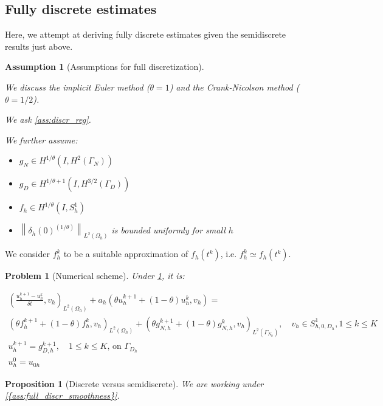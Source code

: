 \documentclass[english,a4paper,9pt,oneside]{scrbook}	%
\theoremstyle{break}
\newtheorem{prop}[equation]{Proposition}
\newtheorem{ass}[equation]{Assumption}
\newtheorem{pb}[equation]{Problem}
\theoremstyle{remark}
\newcommand{\norm}[1]{\left\lVert#1\right\rVert}
\begin{document}
\begin{appendices}
\section{Fully discrete estimates}
\label{sec:fullyd}
Here, we attempt at deriving fully discrete estimates given the semidiscrete results just above.

\begin{ass}[Assumptions for full discretization]
\label{ass:full_discr_smoothness}
\textcolor{white}{ }

We discuss the implicit Euler method ($\theta=1$) and the Crank-Nicolson method ($\theta=1/2$).

We ask \cref{ass:discr_reg}.

We further assume:

\begin{itemize}
	\item $g_N \in H^{1/\theta}(I, H^2(\Gamma_N))$
	\item $g_D \in H^{1/\theta+1}(I, H^{3/2}(\Gamma_D))$
	\item $f_h\in H^{1/\theta}(I, S^1_{h})$
	\item $\norm{\delta_{h}(0)^{(1/\theta)}}_{L^2(\Omega_h)}$ is bounded uniformly for small $h$
\end{itemize}

\end{ass}

We consider $f_h^k$ to be a suitable approximation of $f_h(t^k)$, i.e. $f_h^k \simeq f_h(t^k)$.

\begin{pb}[Numerical scheme]
\label{pb:num_scheme}
Under \cref{ass:full_discr_smoothness}, it is:

\begin{align*}
\left ( \frac{u_{h}^{k+1}-u_h^k}{\delta t}, v_h\right)_{L^2(\Omega_h)} + a_h(\theta u_h^{k+1}+(1-\theta)u^k_h, v_h) =\\ (\theta f_h^{k+1}+(1-\theta)f_h^k, v_h)_{L^2(\Omega_h)} + (\theta g_{N,h}^{k+1} + (1 - \theta)g_{N,h}^{k} , v_h)_{L^2(\Gamma_{N_h})},\quad v_h \in S^1_{h,0,D_h}, 1\leq k \leq K\\
u_h^{k+1}=g_{D,h}^{k+1},\quad 1\leq k \leq K \text{,  on } \Gamma_{D_h}\\
u_h^0=u_{0h}
\end{align*}

\end{pb}

\begin{prop}[Discrete versus semidiscrete]
\label{prop:d_vd_sd}
We are working under \cref{{ass:full_discr_smoothness}}.


\end{prop}
\end{appendices}
\end{document}
